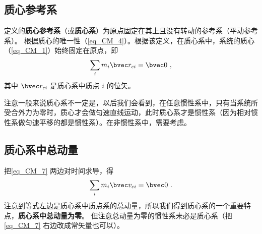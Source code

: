 

\subsection{质心参考系}\label{sub_CM_2}
定义的\textbf{质心参考系}（或\textbf{质心系}）为原点固定在其上且没有转动的参考系（平动参考系）。%
根据质心的唯一性（\autoref{eq_CM_4}）。根据该定义，在质心系中，系统的质心（\autoref{eq_CM_1}）始终固定在原点，即
\begin{equation}\label{eq_CM_7}
\sum_i m_i \bvec r_{ci} = \bvec 0~,
\end{equation}
其中 $\bvec r_{ci}$ 是质心系中质点 $i$ 的位矢。

注意一般来说质心系不一定是，以后我们会看到，在任意惯性系中，只有当系统所受合外力为零时，质心才会做匀速直线运动，此时质心系才是惯性系（因为相对惯性系做匀速平移的都是惯性系）。在非惯性系中，需要考虑。

\subsection{质心系中总动量}
把\autoref{eq_CM_7} 两边对时间求导，得
\begin{equation}\label{eq_CM_8}
\sum_i m_i \bvec v_{ci} = \bvec 0~.
\end{equation}
注意到等式左边是质心系中质点系的总动量，所以我们得到质心系的一个重要特点，\textbf{质心系中总动量为零}。 但注意总动量为零的惯性系未必是质心系（把\autoref{eq_CM_7} 右边改成常矢量也可以）。

